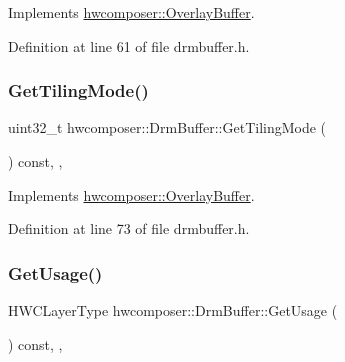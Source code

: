 Implements \mbox{\hyperlink{classhwcomposer_1_1OverlayBuffer_a32b5e1284161f9c129ad79ac11da760e}{hwcomposer\+::\+Overlay\+Buffer}}.



Definition at line 61 of file drmbuffer.\+h.


\begin{DoxyCode}{0}
\end{DoxyCode}
\mbox{\label{classhwcomposer_1_1DrmBuffer_ae559626c3e3029ab95906bbc5c9319f7}} 
\subsubsection{\texorpdfstring{Get\+Tiling\+Mode()}{GetTilingMode()}}
{\footnotesize\ttfamily uint32\+\_\+t hwcomposer\+::\+Drm\+Buffer\+::\+Get\+Tiling\+Mode (\begin{DoxyParamCaption}{ }\end{DoxyParamCaption}) const\hspace{0.3cm}{\ttfamily [inline]}, {\ttfamily [override]}, {\ttfamily [virtual]}}



Implements \mbox{\hyperlink{classhwcomposer_1_1OverlayBuffer_a031e9b24c6dcbdd8a4ae6d842dac5db0}{hwcomposer\+::\+Overlay\+Buffer}}.



Definition at line 73 of file drmbuffer.\+h.


\begin{DoxyCode}{0}
\end{DoxyCode}
\mbox{\label{classhwcomposer_1_1DrmBuffer_a41cb25d650c188e8be9ffa972776680b}} 
\subsubsection{\texorpdfstring{Get\+Usage()}{GetUsage()}}
{\footnotesize\ttfamily H\+W\+C\+Layer\+Type hwcomposer\+::\+Drm\+Buffer\+::\+Get\+Usage (\begin{DoxyParamCaption}{ }\end{DoxyParamCaption}) const\hspace{0.3cm}{\ttfamily [inline]}, {\ttfamily [override]}, {\ttfamily [virtual]}}



